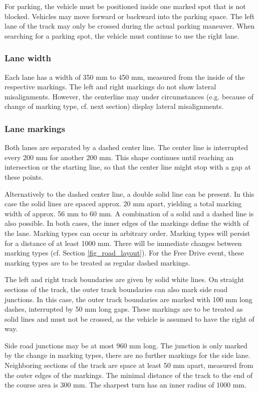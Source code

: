 \documentclass[a4paper]{report}
\begin{document}
For parking, the vehicle must be positioned inside one marked spot that is not
blocked. Vehicles may move forward or backward into the parking space. The left
lane of the track may only be crossed during the actual parking maneuver. When
searching for a parking spot, the vehicle must continue to use the right lane.

\subsubsection{Lane width}

Each lane has a width of 350 mm to 450 mm, measured from the inside of the
respective markings. The left and right markings do not show lateral
misalignments. However, the centerline may under circumstances (e.g. because of
change of marking type, cf. next section) display lateral misalignments.

\subsubsection{Lane markings}
\label{lane_markings}

Both lanes are separated by a dashed center line. The center line is
interrupted every 200 mm for another 200 mm. This shape continues until
reaching an intersection or the starting line, so that the center line might
stop with a gap at these points.

Alternatively to the dashed center line, a double solid line can be present. In
this case the solid lines are spaced approx. 20 mm apart, yielding a total
marking width of approx. 56 mm to 60 mm. A combination of a solid and a dashed
line is also possible. In both cases, the inner edges of the markings define
the width of the lane. Marking types can occur in arbitrary order. Marking
types will persist for a distance of at least 1000 mm. There will be immediate
changes between marking types (cf. Section \ref{fig_road_layout}). For the Free
Drive event, these marking types are to be treated as regular dashed markings.

The left and right track boundaries are given by solid white lines. On straight
sections of the track, the outer track boundaries can also mark side road
junctions. In this case, the outer track boundaries are marked with 100 mm long
dashes, interrupted by 50 mm long gaps. These markings are to be treated as
solid lines and must not be crossed, as the vehicle is assumed to have the
right of way.

Side road junctions may be at most 960 mm long. The junction is only marked by
the change in marking types, there are no further markings for the side lane.
Neighboring sections of the track are space at least 50 mm apart, measured from
the outer edges of the markings. The minimal distance of the track to the end
of the course area is 300 mm. The sharpest turn has an inner radius of 1000 mm.
\end{document}
